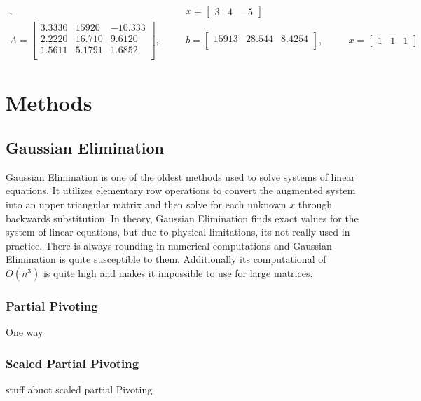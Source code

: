 \documentclass[11pt]{article}	%
\begin{document}
\begin{math}
\begin{alignedat}{3}
        ,&& \quad
        x = \begin{bmatrix}
                3 & 4 & -5
            \end{bmatrix}\\
        A = \begin{bmatrix}
                3.3330 & 15920 & -10.333\\
                2.2220 & 16.710 & 9.6120\\
                1.5611 & 5.1791 & 1.6852\\
            \end{bmatrix}
        ,&& \quad
        b = \begin{bmatrix}
                15913 & 28.544 & 8.4254\\
            \end{bmatrix}
        ,&& \quad
        x = \begin{bmatrix}
                1 & 1 & 1
            \end{bmatrix}
    \end{alignedat}
\end{math}

\section{Methods}

\subsection{Gaussian Elimination}
Gaussian Elimination is one of the oldest methods used to solve systems of linear equations. It utilizes elementary row operations to convert the augmented system into an upper triangular matrix and then solve for each unknown $x$ through backwards substitution. In theory, Gaussian Elimination finds exact values for the system of linear equations, but due to physical limitations, its not really used in practice. There is always rounding in numerical computations and Gaussian Elimination is quite susceptible to them. Additionally its computational of $O(n^3)$ is quite high and makes it impossible to use for large matrices. 

    \subsubsection{Partial Pivoting}
    One way 

    \subsubsection{Scaled Partial Pivoting}
    stuff abuot scaled partial Pivoting
\end{document}
